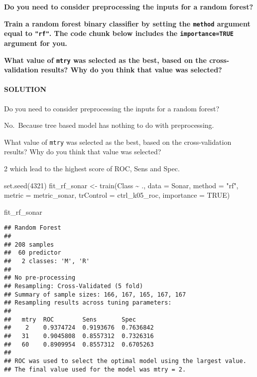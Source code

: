\documentclass[
]{article}
\newenvironment{Shaded}{\begin{snugshade}}{\end{snugshade}}
\newcommand{\AttributeTok}[1]{\textcolor[rgb]{0.77,0.63,0.00}{#1}}
\newcommand{\ConstantTok}[1]{\textcolor[rgb]{0.00,0.00,0.00}{#1}}
\newcommand{\DecValTok}[1]{\textcolor[rgb]{0.00,0.00,0.81}{#1}}
\newcommand{\FunctionTok}[1]{\textcolor[rgb]{0.00,0.00,0.00}{#1}}
\newcommand{\NormalTok}[1]{#1}
\newcommand{\OtherTok}[1]{\textcolor[rgb]{0.56,0.35,0.01}{#1}}
\newcommand{\SpecialCharTok}[1]{\textcolor[rgb]{0.00,0.00,0.00}{#1}}
\newcommand{\StringTok}[1]{\textcolor[rgb]{0.31,0.60,0.02}{#1}}
\begin{document}
\textbf{Do you need to consider preprocessing the inputs for a random
forest?}

\textbf{Train a random forest binary classifier by setting the
\texttt{method} argument equal to \texttt{"rf"}. The code chunk below
includes the \texttt{importance=TRUE} argument for you.}

\textbf{What value of \texttt{mtry} was selected as the best, based on
the cross-validation results? Why do you think that value was selected?}

\hypertarget{solution-17}{%
\paragraph{SOLUTION}\label{solution-17}}

Do you need to consider preprocessing the inputs for a random forest?

No.~Because tree based model has nothing to do with preprocessing.

What value of \texttt{mtry} was selected as the best, based on the
cross-validation results? Why do you think that value was selected?

2 which lead to the highest score of ROC, Sens and Spec.

\begin{Shaded}
\begin{Highlighting}[]
\FunctionTok{set.seed}\NormalTok{(}\DecValTok{4321}\NormalTok{)}
\NormalTok{fit\_rf\_sonar }\OtherTok{\textless{}{-}} \FunctionTok{train}\NormalTok{(Class }\SpecialCharTok{\textasciitilde{}}\NormalTok{ ., }
                      \AttributeTok{data =}\NormalTok{ Sonar,}
                      \AttributeTok{method =} \StringTok{"rf"}\NormalTok{,}
                      \AttributeTok{metric =}\NormalTok{ metric\_sonar,}
                      \AttributeTok{trControl =}\NormalTok{ ctrl\_k05\_roc,}
                      \AttributeTok{importance =} \ConstantTok{TRUE}\NormalTok{)}

\NormalTok{fit\_rf\_sonar}
\end{Highlighting}
\end{Shaded}

\begin{verbatim}
## Random Forest 
## 
## 208 samples
##  60 predictor
##   2 classes: 'M', 'R' 
## 
## No pre-processing
## Resampling: Cross-Validated (5 fold) 
## Summary of sample sizes: 166, 167, 165, 167, 167 
## Resampling results across tuning parameters:
## 
##   mtry  ROC        Sens       Spec     
##    2    0.9374724  0.9193676  0.7636842
##   31    0.9045808  0.8557312  0.7326316
##   60    0.8909954  0.8557312  0.6705263
## 
## ROC was used to select the optimal model using the largest value.
## The final value used for the model was mtry = 2.
\end{verbatim}
\end{document}
